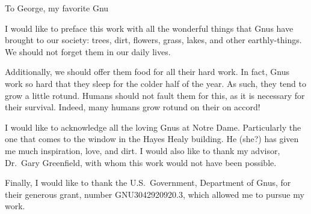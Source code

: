 \documentclass[final,numrefs,sort&compress,twoadvisors]{nddiss2e}
\begin{document}
\renewcommand{\dedicationname}{NEW DEDICATION NAME}

\begin{dedication}
  To George, my favorite Gnu
\end{dedication}

\tableofcontents
\listoffigures
\listoftables

\begin{preface}
  I would like to preface this work with all the wonderful things that
  Gnus have brought to our society: trees, dirt, flowers, grass,
  lakes, and other earthly-things.  We should not forget them in our
  daily lives.

  Additionally, we should offer them food for all their hard work.  In
  fact, Gnus work so hard that they sleep for the colder half of
  the year.  As such, they tend to grow a little rotund.  Humans
  should not fault them for this, as it is necessary for their
  survival.  Indeed, many humans grow rotund on their on accord!
\end{preface}

\begin{acknowledge}
  I would like to acknowledge all the loving Gnus at Notre Dame.
  Particularly the one that comes to the window in the Hayes Healy
  building.  He (she?) has given me much inspiration, love, and dirt.
  I would also like to thank my advisor, Dr.\ Gary Greenfield, with
  whom this work would not have been possible.

  Finally, I would like to thank the U.S.\ Government, Department of
  Gnus, for their generous grant, number GNU3042920920.3, which
  allowed me to pursue my work.
\end{acknowledge}

\begin{symbols}
\end{symbols}

\mainmatter
%
\end{document}
